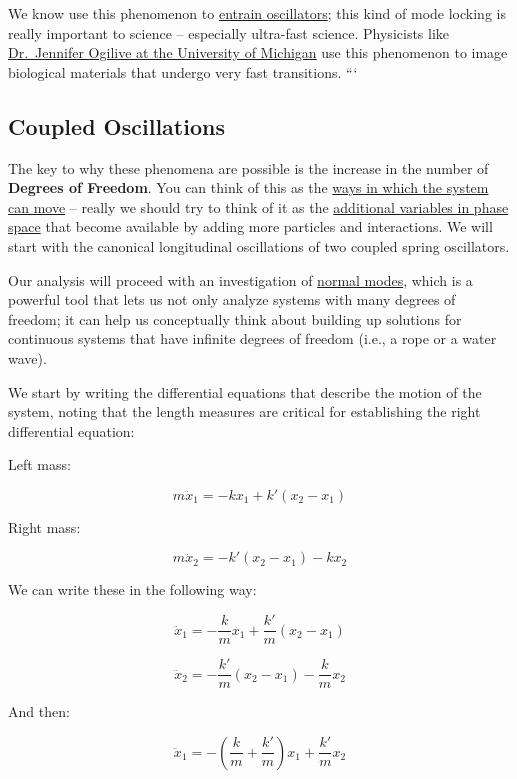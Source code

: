 We know use this phenomenon to
\href{https://en.wikipedia.org/wiki/Injection_locking\#Entrainment}{entrain
oscillators}; this kind of mode locking is really important to science
-- especially ultra-fast science. Physicists like
\href{https://www.ogilviegroup.org/}{Dr.~Jennifer Ogilive at the
University of Michigan} use this phenomenon to image biological
materials that undergo very fast transitions. ```

\subsection{Coupled Oscillations}\label{coupled-oscillations}

The key to why these phenomena are possible is the increase in the
number of \textbf{Degrees of Freedom}. You can think of this as the
\href{https://en.wikipedia.org/wiki/Degrees_of_freedom_(mechanics)}{ways
in which the system can move} -- really we should try to think of it as
the
\href{https://en.wikipedia.org/wiki/Degrees_of_freedom_(physics_and_chemistry)}{additional
variables in phase space} that become available by adding more particles
and interactions. We will start with the canonical longitudinal
oscillations of two coupled spring oscillators.

Our analysis will proceed with an investigation of
\href{https://en.wikipedia.org/wiki/Normal_mode}{normal modes}, which is
a powerful tool that lets us not only analyze systems with many degrees
of freedom; it can help us conceptually think about building up
solutions for continuous systems that have infinite degrees of freedom
(i.e., a rope or a water wave).

We start by writing the differential equations that describe the motion
of the system, noting that the length measures are critical for
establishing the right differential equation:

Left mass:

\[m \ddot{x}_{1} = -k x_1 + k'(x_2-x_1)\]

Right mass:

\[m \ddot{x}_{2} = - k'(x_2-x_1)-kx_2\]

We can write these in the following way:

\[\ddot{x}_{1} = -\dfrac{k}{m} x_1 + \dfrac{k'}{m}(x_2-x_1)\]

\[\ddot{x}_{2} = - \dfrac{k'}{m}(x_2-x_1)-\dfrac{k}{m}x_2\]

And then:

\[\ddot{x}_{1} = -\left(\dfrac{k}{m}+\dfrac{k'}{m}\right) x_1 + \dfrac{k'}{m}x_2\]

